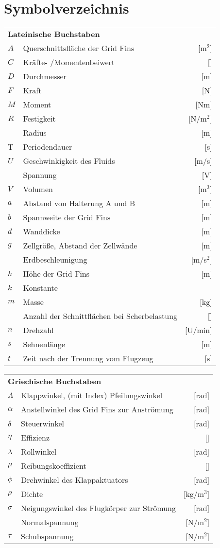 \chapter*{Symbolverzeichnis}						%

\begin{longtable}[l]{llr}
\multicolumn{3}{l}{\textbf{Lateinische Buchstaben}}\\
$A$&Querschnittsfläche der Grid Fins&[m$^2$]\\
$C$&Kräfte- /Momentenbeiwert&[]\\
$D$&Durchmesser&[m]\\
$F$&Kraft&[N]\\
$M$&Moment&[Nm]\\
$R$&Festigkeit&[N/m$^2$]\\
~&Radius&[m]\\
T&Periodendauer&[s]\\
$U$&Geschwinkigkeit des Fluids&[m/s]\\
~&Spannung&[V]\\
$V$&Volumen&[m$^3$]\\
$a$&Abstand von Halterung A und B&[m]\\
$b$&Spannweite der Grid Fins&[m]\\
$d$&Wanddicke&[m]\\
$g$&Zellgröße, Abstand der Zellwände&[m]\\
~&Erdbeschleunigung&[m/s$^2$]\\
$h$&Höhe der Grid Fins&[m]\\
$k$&Konstante&~\\
$m$&Masse&[kg]\\
~&Anzahl der Schnittflächen bei Scherbelastung&[]\\
$n$&Drehzahl&[U/min]\\
$s$&Sehnenlänge&[m]\\
$t$&Zeit nach der Trennung vom Flugzeug&[s]\\
\end{longtable}


\begin{longtable}[l]{llr}
	\multicolumn{3}{l}{\textbf{Griechische Buchstaben}}\\
	$\Lambda$&Klappwinkel, (mit Index) Pfeilungswinkel&[rad]\\
	$\alpha$&Anstellwinkel des Grid Fins zur Anströmung&[rad]\\
	$\delta$&Steuerwinkel&[rad]\\
	$\eta$&Effizienz&[]\\
	$\lambda$&Rollwinkel&[rad]\\
	$\mu$&Reibungskoeffizient&[]\\
	$\phi$&Drehwinkel des Klappaktuators&[rad]\\
	$\rho$&Dichte&[kg/m$^3$]\\
	$\sigma$&Neigungswinkel des Flugkörper zur Strömung&[rad]\\
	~&Normalspannung&[N/m$^2$]\\
	$\tau$&Schubspannung&[N/m$^2$]\\
\end{longtable}

